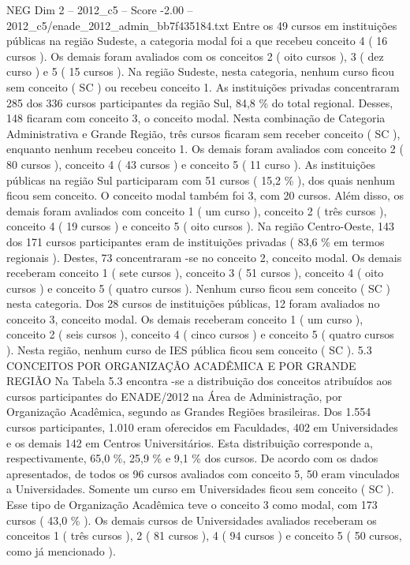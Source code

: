 \begin{textsample}{NEG Dim 2 – 2012\_c5 – Score -2.00 – 2012\_c5/enade\_2012\_admin\_bb7f435184.txt}
Entre os 49 cursos em instituições públicas na região Sudeste, a categoria modal foi a que recebeu conceito 4 ( 16 cursos ).
Os demais foram avaliados com os conceitos 2 ( oito cursos ), 3 ( dez curso ) e 5 ( 15 cursos ).
Na região Sudeste, nesta categoria, nenhum curso ficou sem conceito ( SC ) ou recebeu conceito 1.
As instituições privadas concentraram 285 dos 336 cursos participantes da região Sul, 84,8 \% do total regional.
Desses, 148 ficaram com conceito 3, o conceito modal.
Nesta combinação de Categoria Administrativa e Grande Região, três cursos ficaram sem receber conceito ( SC ), enquanto nenhum recebeu conceito 1.
Os demais foram avaliados com conceito 2 ( 80 cursos ), conceito 4 ( 43 cursos ) e conceito 5 ( 11 curso ).
As instituições públicas na região Sul participaram com 51 cursos ( 15,2 \% ), dos quais nenhum ficou sem conceito.
O conceito modal também foi 3, com 20 cursos.
Além disso, os demais foram avaliados com conceito 1 ( um curso ), conceito 2 ( três cursos ), conceito 4 ( 19 cursos ) e conceito 5 ( oito cursos ).
Na região Centro-Oeste, 143 dos 171 cursos participantes eram de instituições privadas ( 83,6 \% em termos regionais ).
Destes, 73 concentraram -se no conceito 2, conceito modal.
Os demais receberam conceito 1 ( sete cursos ), conceito 3 ( 51 cursos ), conceito 4 ( oito cursos ) e conceito 5 ( quatro cursos ).
Nenhum curso ficou sem conceito ( SC ) nesta categoria.
Dos 28 cursos de instituições públicas, 12 foram avaliados no conceito 3, conceito modal.
Os demais receberam conceito 1 ( um curso ), conceito 2 ( seis cursos ), conceito 4 ( cinco cursos ) e conceito 5 ( quatro cursos ).
Nesta região, nenhum curso de IES pública ficou sem conceito ( SC ). 5.3 CONCEITOS POR ORGANIZAÇÃO ACADÊMICA E POR GRANDE REGIÃO Na Tabela 5.3 encontra -se a distribuição dos conceitos atribuídos aos cursos participantes do ENADE/2012 na Área de Administração, por Organização Acadêmica, segundo as Grandes Regiões brasileiras.
Dos 1.554 cursos participantes, 1.010 eram oferecidos em Faculdades, 402 em Universidades e os demais 142 em Centros Universitários.
Esta distribuição corresponde a, respectivamente, 65,0 \%, 25,9 \% e 9,1 \% dos cursos.
De acordo com os dados apresentados, de todos os 96 cursos avaliados com conceito 5, 50 eram vinculados a Universidades.
Somente um curso em Universidades ficou sem conceito ( SC ).
Esse tipo de Organização Acadêmica teve o conceito 3 como modal, com 173 cursos ( 43,0 \% ).
Os demais cursos de Universidades avaliados receberam os conceitos 1 ( três cursos ), 2 ( 81 cursos ), 4 ( 94 cursos ) e conceito 5 ( 50 cursos, como já mencionado ).

\end{textsample}
